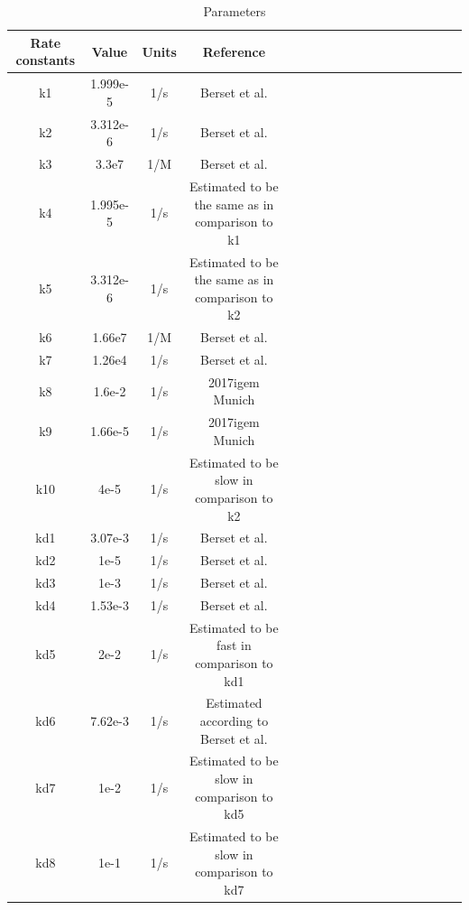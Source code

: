 \\\\
\begin{table}[htbp]
	\centering
	\caption{\label {tab:test} Parameters}
	\begin{tabular}{cccccccccccccccccc}
		\toprule
		Rate constants & Value& Units & Reference\\
		\midrule
		k1 & 1.999e-5 &1/s & Berset et al. \\
	k2 & 3.312e-6 &1/s & Berset et al.\\
	k3 & 3.3e7    & 1/M &Berset et al.   \\
	k4 &1.995e-5 &1/s & Estimated to be the same as in comparison to k1\\
	k5 & 3.312e-6 &1/s&Estimated to be the same as in comparison to k2\\
	k6 &1.66e7   &1/M & Berset et al.  \\
	k7  &1.26e4 &1/s & Berset et al. \\
	k8&1.6e-2& 1/s & 2017igem Munich\\
	k9 &1.66e-5&1/s&  2017igem Munich\\ 
	k10&4e-5&1/s & Estimated to be slow in comparison to k2 \\
	kd1 & 3.07e-3&1/s & Berset et al.\\
	kd2&1e-5&1/s & Berset et al.\\
	kd3&1e-3&1/s  & Berset et al.\\
	kd4&1.53e-3&1/s  & Berset et al.\\
	kd5 & 2e-2&1/s & Estimated to be fast in comparison to kd1\\
	kd6&7.62e-3&1/s&  Estimated according to Berset et al.\\
	kd7& 1e-2&1/s&  Estimated to be slow in comparison to kd5\\
	kd8&1e-1&1/s&  Estimated to be slow in comparison to kd7\\			
		\bottomrule
	\end{tabular}
\end{table}